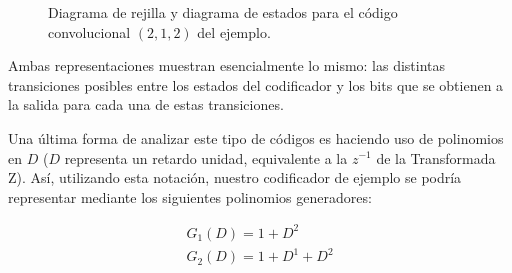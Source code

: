 \documentclass[es,apuntes]{uah}
\begin{document}
{\begin{figure}
	\centering
		\caption{Diagrama de rejilla  y diagrama de estados  para el código convolucional $(2,1,2)$ del ejemplo.}	
		\label{fig:RejillayEstadosCodigoConvolucional}
\end{figure}

Ambas representaciones muestran esencialmente lo mismo: las distintas transiciones posibles entre los estados del codificador y los bits que se obtienen a la salida para cada una de estas transiciones.

Una última forma de analizar este tipo de códigos es haciendo uso de polinomios en $D$ ($D$ representa un retardo unidad, equivalente a la $z^{-1}$ de la Transformada Z). Así, utilizando esta notación, nuestro codificador de ejemplo se podría representar mediante los siguientes polinomios generadores:

\begin{displaymath}
\begin{array}{l}
	G_1(D) = 1 + D^2\\
	G_2(D) = 1 + D^1 + D^2
\end{array}
\end{displaymath}


}
\end{document}
